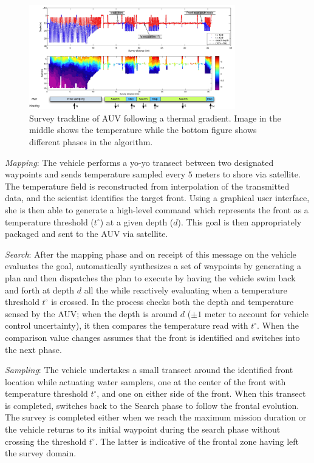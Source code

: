 \begin{figure}[b]
\centering
\includegraphics[width=0.8\textwidth]{figs/front-mi.jpeg}
\caption{\small{Survey trackline of AUV following a thermal
    gradient. Image in the middle shows the temperature while the
    bottom figure shows different phases in the algorithm.}}
\label{fig:mi-front}
\end{figure}

\emph{Mapping}: The vehicle performs a yo-yo transect between two
designated waypoints and sends temperature sampled every $5$ meters to
shore via satellite. The temperature field is reconstructed from
interpolation of the transmitted data, and the scientist identifies
the target front. Using a graphical user interface, she is then able
to generate a high-level command which represents the front as a
temperature threshold ($t^{\circ}$) at a given depth ($d$). This goal is
then appropriately packaged and sent to the AUV via satellite.

\emph{Search}: After the mapping phase and on receipt of this message
on the vehicle \rx evaluates the goal, automatically synthesizes a set
of waypoints by generating a plan and then dispatches the plan to
execute by having the vehicle swim back and forth at depth $d$ all the
while reactively evaluating when a temperature threshold $t^{\circ}$
is crossed. In the process \rx checks both the depth and temperature
sensed by the AUV; when the depth is around $d$ ($\pm 1$ meter to
account for vehicle control uncertainty), it then compares the
temperature read with $t^{\circ}$. When the comparison value changes
\rx assumes that the front is identified and switches into the next
phase.

\emph{Sampling}: The vehicle undertakes a small transect around the
identified front location while actuating water samplers, one at the
center of the front with temperature threshold $t^{\circ}$, and one on
either side of the front. When this transect is completed, \rx
switches back to the Search phase to follow the frontal evolution.
The survey is completed either when we reach the maximum mission
duration or the vehicle returns to its initial waypoint during the
search phase without crossing the threshold $t^{\circ}$. The latter is
indicative of the frontal zone having left the survey domain.

